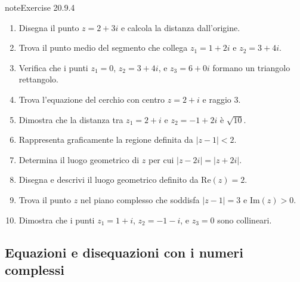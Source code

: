 \documentclass[letterpaper,10pt,italian]{jupyterBook}
\begin{document}
\begin{sphinxadmonition}{note}{Exercise 20.9.4}


\begin{enumerate}
%
\item {} 
\sphinxAtStartPar
Disegna il punto \(z = 2 + 3i\) e calcola la distanza dall’origine.

\item {} 
\sphinxAtStartPar
Trova il punto medio del segmento che collega \(z_1 = 1 + 2i\) e \(z_2 = 3 + 4i\).

\item {} 
\sphinxAtStartPar
Verifica che i punti \(z_1 = 0\), \(z_2 = 3 + 4i\), e \(z_3 = 6 + 0i\) formano un triangolo rettangolo.

\item {} 
\sphinxAtStartPar
Trova l’equazione del cerchio con centro \(z = 2 + i\) e raggio \(3\).

\item {} 
\sphinxAtStartPar
Dimostra che la distanza tra \(z_1 = 2 + i\) e \(z_2 = -1 + 2i\) è \(\sqrt{10}\).

\item {} 
\sphinxAtStartPar
Rappresenta graficamente la regione definita da \(|z - 1| < 2\).

\item {} 
\sphinxAtStartPar
Determina il luogo geometrico di \(z\) per cui \(|z - 2i| = |z + 2i|\).

\item {} 
\sphinxAtStartPar
Disegna e descrivi il luogo geometrico definito da \(\text{Re}(z) = 2\).

\item {} 
\sphinxAtStartPar
Trova il punto \(z\) nel piano complesso che soddisfa \(|z - 1| = 3\) e \(\text{Im}(z) > 0\).

\item {} 
\sphinxAtStartPar
Dimostra che i punti \(z_1 = 1 + i\), \(z_2 = -1 - i\), e \(z_3 = 0\) sono collineari.

\end{enumerate}
\end{sphinxadmonition}


\subsection{Equazioni e disequazioni con i numeri complessi}
\label{\detokenize{ch/algebra/complex-algebra-problems:equazioni-e-disequazioni-con-i-numeri-complessi}}\label{\detokenize{ch/algebra/complex-algebra-problems:math-hs-algebra-complex-problems-equations}}
\end{document}
